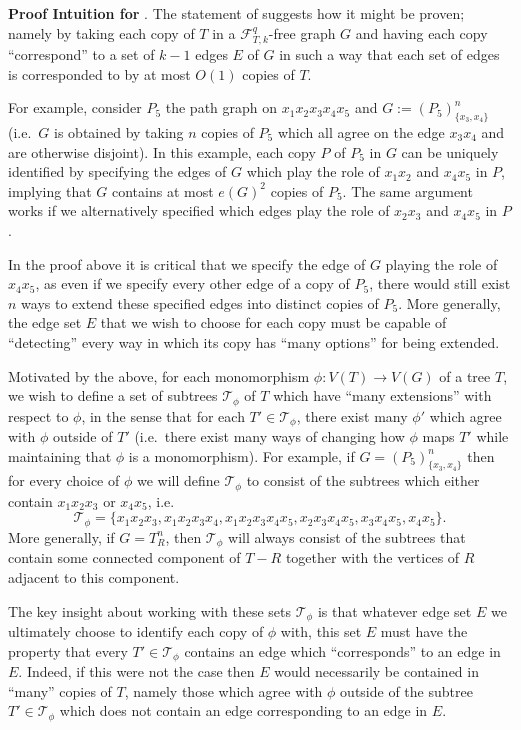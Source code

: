 \documentclass[12pt,letterpaper]{article}
\theoremstyle{definition}
\newcommand{\pow}{q} %
\renewcommand{\c}[1]{\mathcal{#1}}
\begin{document}
	
	\textbf{Proof Intuition for }.  The statement of  suggests how it might be proven; namely by taking each copy of $T$ in a $\c{F}_{T,k}^\pow$-free graph $G$ and having each copy ``correspond'' to a set of $k-1$ edges $E$ of $G$ in such a way that each set of edges is corresponded to by at most $O(1)$ copies of $T$.  
	
	For example, consider $P_5$ the path graph on $x_1x_2x_3x_4x_5$ and $G:=(P_5)_{\{x_3,x_4\}}^n$ (i.e.\ $G$ is obtained by taking $n$ copies of $P_5$ which all agree on the edge $x_3x_4$ and are otherwise disjoint).   In this example, each copy $P$ of $P_5$ in $G$ can be uniquely identified by specifying the edges of $G$ which play the role of $x_1x_2$ and $x_4x_5$ in $P$, implying that $G$ contains at most $e(G)^2$ copies of $P_5$.  The same argument works if we alternatively specified which edges play the role of $x_2x_3$ and $x_4x_5$ in $P$.
	
	In the proof above it is  critical that we specify the edge of $G$ playing the role of $x_4x_5$, as even if we specify every other edge of a copy of $P_5$, there would still exist $n$ ways to extend these specified edges into distinct copies of $P_5$.  More generally, the edge set $E$ that we wish to choose for each copy must be capable of ``detecting'' every way in which its copy has ``many options'' for being extended.
	
	Motivated by the above, for each monomorphism $\phi:V(T)\to V(G)$ of a tree $T$, we wish to define a set of subtrees $\c{T}_\phi$ of $T$ which have ``many extensions'' with respect to $\phi$, in the sense that for each $T'\in \c{T}_\phi$, there exist many $\phi'$ which agree with $\phi$ outside of $T'$ (i.e.\ there exist many ways of changing how $\phi$ maps $T'$ while maintaining that $\phi$ is a monomorphism).  For example, if $G=(P_5)^n_{\{x_3,x_4\}}$ then for every choice of $\phi$ we will define $\c{T}_\phi$ to consist of the subtrees which either contain $x_1x_2x_3$ or $x_4x_5$, i.e.
	\[
	\c{T}_{\phi}=\{x_1x_2x_3,x_1x_2x_3x_4,x_1x_2x_3x_4x_5,x_2x_3x_4x_5,x_3x_4x_5,x_4x_5\}.
	\]
	More generally, if $G=T_R^n$, then $\c{T}_\phi$ will always consist of the subtrees that contain some connected component of $T-R$ together with the vertices of $R$ adjacent to this component.
	
	The key insight about working with these sets $\c{T}_\phi$ is that whatever edge set $E$ we ultimately choose to identify each copy of $\phi$ with, this set $E$ must have the property that every $T'\in \c{T}_\phi$ contains an edge which ``corresponds'' to an edge in $E$.  Indeed, if this were not the case then $E$ would necessarily be contained in ``many'' copies of $T$, namely those which agree with $\phi$ outside of the subtree $T'\in \c{T}_\phi$ which does not contain an edge corresponding to an edge in $E$.
	
\end{document}
